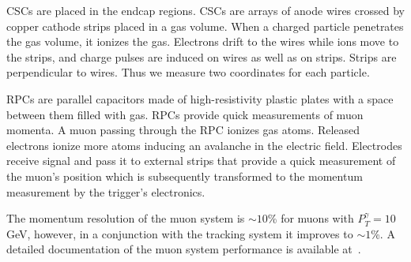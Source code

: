 CSCs are placed in the endcap regions. CSCs are arrays of anode wires crossed by copper cathode strips placed in a gas volume. When a charged particle penetrates the gas volume, it ionizes the gas. Electrons drift to the wires while ions move to the strips, and charge pulses are induced on wires as well as on strips. Strips are perpendicular to wires. Thus we measure two coordinates for each particle.  

RPCs are parallel capacitors made of high-resistivity plastic plates with a space between them filled with gas. RPCs provide quick measurements of muon momenta. A muon passing through the RPC ionizes gas atoms. Released electrons ionize more atoms inducing an avalanche in the electric field. Electrodes receive signal and pass it to external strips that provide a quick measurement of the muon's position which is subsequently transformed to the momentum measurement by the trigger's electronics. 

The momentum resolution of the muon system is $\sim 10$\% for muons with $P_T^{\gamma}=10~$GeV, however, in a conjunction with the tracking system it improves to $\sim 1$\%. A detailed documentation of the muon system performance is available at~\cite{ref_MuonSystemPerformance}. 


